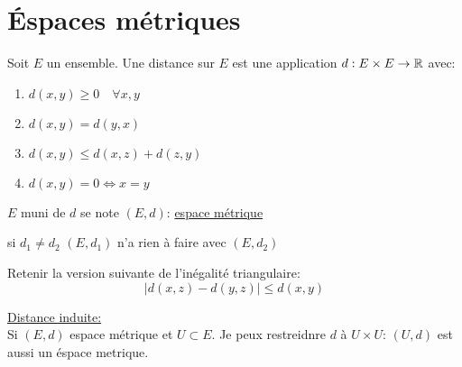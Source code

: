 \documentclass[a4paper]{report}
\begin{document}
\chapter{Éspaces métriques}
\begin{definition}
    Soit $E$ un ensemble. Une distance sur $E$ est une application  $d: E \times E \to \mathbb{R}$ avec:
    \begin{enumerate}
        \item $d(x, y) \ge 0 \quad \forall x, y$
        \item $d(x, y) = d(y, x)$
        \item  $d(x, y) \le  d(x, z) + d(z, y)$
        \item $d(x, y) = 0 \iff x = y$
    \end{enumerate}
    $E$ muni de  $d$ se note  $(E, d)$: \underline{espace métrique}
\end{definition}
\begin{remark}
   si $d_1 \neq d_2$ $(E, d_1)$ n'a rien à faire avec  $(E, d_2)$ 
\end{remark}
\begin{remark}
    Retenir la version suivante de l'inégalité triangulaire:
    \[
        |d(x, z) - d(y, z)| \le d(x, y)
    \] 
\end{remark}
\begin{remark}
    \underline{Distance induite:}\\
    Si $(E, d)$ espace métrique et  $U \subset E$. Je peux restreidnre $d$ à  $U \times U$:  $(U, d)$ est aussi un éspace metrique.
\end{remark}
\end{document}
